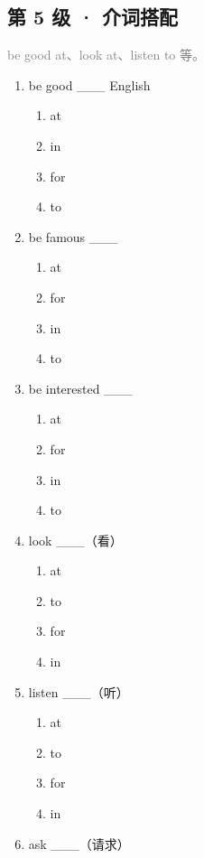 \documentclass[11pt,a4paper]{ctexart}
\begin{document}
\subsection*{第 5 级 · 介词搭配}
\noindent\textcolor{gray}{be good at、look at、listen to 等。}\par\smallskip
\begin{enumerate}[leftmargin=*,itemsep=4pt]
\item be good \_\_\_ English
\begin{enumerate}[label=\Alph*.,leftmargin=2em,itemsep=1pt,topsep=2pt]
\item at
\item in
\item for
\item to
\end{enumerate}
\item be famous \_\_\_
\begin{enumerate}[label=\Alph*.,leftmargin=2em,itemsep=1pt,topsep=2pt]
\item at
\item for
\item in
\item to
\end{enumerate}
\item be interested \_\_\_
\begin{enumerate}[label=\Alph*.,leftmargin=2em,itemsep=1pt,topsep=2pt]
\item at
\item for
\item in
\item to
\end{enumerate}
\item look \_\_\_（看）
\begin{enumerate}[label=\Alph*.,leftmargin=2em,itemsep=1pt,topsep=2pt]
\item at
\item to
\item for
\item in
\end{enumerate}
\item listen \_\_\_（听）
\begin{enumerate}[label=\Alph*.,leftmargin=2em,itemsep=1pt,topsep=2pt]
\item at
\item to
\item for
\item in
\end{enumerate}
\item ask \_\_\_（请求）

\end{enumerate}
\end{document}

